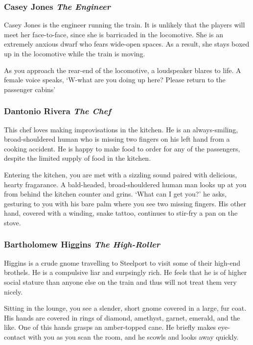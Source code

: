 \documentclass[letterpaper,10pt,twoside,twocolumn,openany]{dndbook}
\begin{document}
\subsubsection{Casey Jones \textit{The Engineer}}
Casey Jones is the engineer running the train.  It is unlikely that the players will meet her face-to-face, since she is barricaded in the locomotive.  She is an extremely anxious dwarf who fears wide-open spaces. As a result, she stays boxed up in the locomotive while the train is moving.

\begin{quotebox}
As you approach the rear-end of the locomotive, a loudspeaker blares to life.  A female voice speaks, `W-what are you doing up here?  Please return to the passenger cabins'
\end{quotebox}

\subsubsection{Dantonio Rivera \textit{The Chef}}
This chef loves making improvisations in the kitchen.  He is an always-smiling, broad-shouldered human who is missing two fingers on his left hand from a cooking accident.  He is happy to make food to order for any of the passengers, despite the limited supply of food in the kitchen.

\begin{quotebox}
Entering the kitchen, you are met with a sizzling sound paired with delicious, hearty fragarance.  A bald-headed, broad-shouldered human man looks up at you from behind the kitchen counter and grins.  `What can I get you?' he asks, gesturing to you with his bare palm where you see two missing fingers.  His other hand, covered with a winding, snake tattoo, continues to stir-fry a pan on the stove.
\end{quotebox}

\subsubsection{Bartholomew Higgins \textit{The High-Roller}}
Higgins is a crude gnome travelling to Steelport to visit some of their high-end brothels.  He is a compulsive liar and surpsingly rich.  He feels that he is of higher social stature than anyone else on the train and thus will not treat them very nicely.

\begin{quotebox}
Sitting in the lounge, you see a slender, short gnome covered in a large, fur coat.  His hands are covered in rings of diamond, amethyst, garnet, emerald, and the like.  One of this hands grasps an amber-topped cane.  He briefly makes eye-contact with you as you scan the room, and he scowls and looks away quickly.
\end{quotebox}
\end{document}
